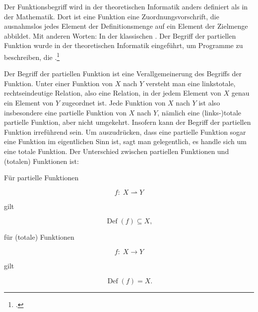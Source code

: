 \documentclass{bschlangaul-theorie}
\begin{document}
Der Funktionsbegriff wird in der theoretischen Informatik anders
definiert als in der Mathematik. Dort ist eine Funktion eine
Zuordnungsvorschrift, die ausnahmslos jedes Element der Definitionsmenge
auf ein Element der Zielmenge abbildet. Mit anderen Worten: In der
klassischen . Der Begriff
der partiellen Funktion wurde in der theoretischen Informatik
eingeführt, um Programme zu beschreiben, die .\footcite[Seite 51]{hoffmann}

Der Begriff der partiellen Funktion ist eine Verallgemeinerung des
Begriffs der Funktion. Unter einer Funktion von $X$ nach $Y$ versteht
man eine linkstotale, rechtseindeutige Relation, also eine Relation, in
der jedem Element von $X$ genau ein Element von $Y$ zugeordnet ist. Jede
Funktion von $X$ nach $Y$ ist also insbesondere eine partielle Funktion
von $X$ nach $Y$, nämlich eine (links-)totale partielle Funktion, aber
nicht umgekehrt. Insofern kann der Begriff der partiellen Funktion
irreführend sein. Um auszudrücken, dass eine partielle Funktion sogar
eine Funktion im eigentlichen Sinn ist, sagt man gelegentlich, es handle
sich um eine totale Funktion. Der Unterschied zwischen partiellen
Funktionen und (totalen) Funktionen ist:

\noindent
Für partielle Funktionen

\begin{displaymath}
f\colon \;X \rightharpoonup Y
\end{displaymath}

\noindent
gilt

\begin{displaymath}
\operatorname {Def} (f) \subseteq X ,
\end{displaymath}

\noindent
für (totale) Funktionen

\begin{displaymath}
f \colon \; X \to Y
\end{displaymath}

\noindent
gilt

\begin{displaymath}
\operatorname {Def} (f)=X .
\end{displaymath}


\end{document}
